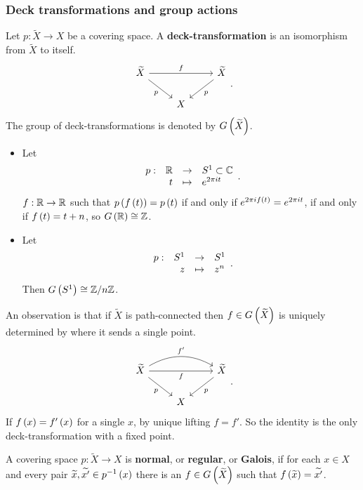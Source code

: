 \subsubsection{Deck transformations and group actions}

\begin{definition*}
Let $ p : \widetilde{X} \to X $ be a covering space. A \textbf{deck-transformation} is an isomorphism from $ \widetilde{X} $ to itself.
$$
\begin{tikzcd}
\widetilde{X} \arrow{rr}{f} \arrow[swap]{dr}{p} & & \widetilde{X} \arrow{dl}{p} \\
& X &
\end{tikzcd}.
$$
The group of deck-transformations is denoted by $ G\left( \widetilde{X} \right) $.
\end{definition*}

\begin{example*}
\hfill
\begin{itemize}
\item Let
$$ \function[p]{\R}{S^1 \subset \C}{t}{e^{2\pi i t}}. $$
$ f : \mathbb{R} \to \mathbb{R} $ such that $ p\left( f\left( t \right) \right) = p\left( t \right) $ if and only if $ e^{2\pi if\left( t \right)} = e^{2\pi it} $, if and only if $ f\left( t \right) = t + n $, so $ G\left( \mathbb{R} \right) \cong \mathbb{Z} $.
\item Let
$$ \function[p]{S^1}{S^1}{z}{z^n}. $$
Then $ G\left( S^1 \right) \cong \mathbb{Z} / n\mathbb{Z} $.
\end{itemize}
\end{example*}

An observation is that if $ \widetilde{X} $ is path-connected then $ f \in G\left( \widetilde{X} \right) $ is uniquely determined by where it sends a single point.
$$
\begin{tikzcd}
\widetilde{X} \arrow[swap]{rr}{f} \arrow[bend left=30]{rr}{f'} \arrow[swap]{dr}{p} & & \widetilde{X} \arrow{dl}{p} \\
& X &
\end{tikzcd}.
$$
If $ f\left( x \right) = f'\left( x \right) $ for a single $ x $, by unique lifting $ f = f' $. So the identity is the only deck-transformation with a fixed point.

\begin{definition*}
A covering space $ p : \widetilde{X} \to X $ is \textbf{normal}, or \textbf{regular}, or \textbf{Galois}, if for each $ x \in X $ and every pair $ \widetilde{x}, \widetilde{x'} \in p^{-1}\left( x \right) $ there is an $ f \in G\left( \widetilde{X} \right) $ such that $ f\left( \widetilde{x} \right) = \widetilde{x'} $.
\end{definition*}

